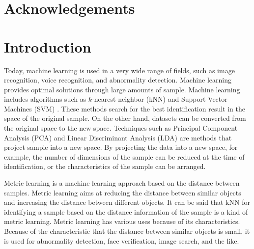 \documentclass[a4paper,12pt]{article}
\begin{document}
\section*{Acknowledgements}


\newpage
\thispagestyle{empty}
\tableofcontents
\clearpage
\setcounter{page}{1}
\section{Introduction}
Today, machine learning is used in a very wide range of fields, such as image recognition, voice recognition, and abnormality detection.
Machine learning provides optimal solutions through large amounts of sample.
Machine learning includes algorithms such as $k$-nearest neighbor (kNN) \cite{Cover1967} and Support Vector Machines (SVM) \cite{Cortes1995}.
These methods search for the best identification result in the space of the original sample.
On the other hand, datasets can be converted from the original space to the new space.
Techniques such as Principal Component Analysis (PCA) \cite{Pearson1901} and Linear Discriminant Analysis (LDA) \cite{Fisher1936} are methods that project sample into a new space.
By projecting the data into a new space, for example, the number of dimensions of the sample can be reduced at the time of identification, or the characteristics of the sample can be arranged.

Metric learning is a machine learning approach based on the distance between samples.
Metric learning aims at reducing the distance between similar objects and increasing the distance between different objects.
It can be said that kNN for identifying a sample based on the distance information of the sample is a kind of metric learning.
Metric learning has various uses because of its characteristics.
Because of the characteristic that the distance between similar objects is small, it is used for abnormality detection, face verification, image search, and the like.
\end{document}
